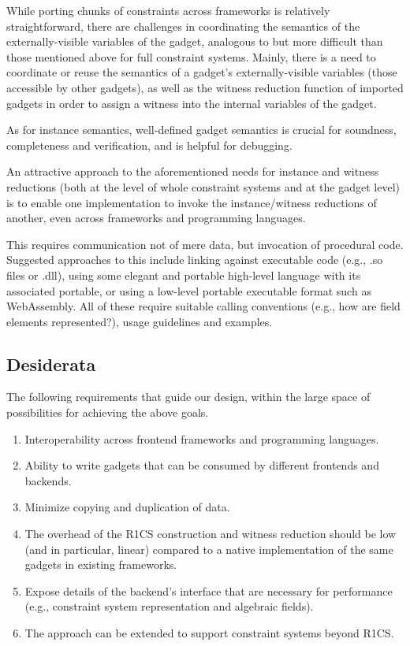 \documentclass[a4paper,12pt]{article}
\begin{document}
While porting chunks of constraints across frameworks is relatively straightforward, there are challenges in coordinating the semantics of the externally-visible variables of the gadget, analogous to but more difficult than those mentioned above for full constraint systems. Mainly, there is a need to coordinate or reuse the semantics of a gadget’s externally-visible variables (those accessible by other gadgets), as well as the witness reduction function of imported gadgets in order to assign a witness into the internal variables of the gadget.

As for instance semantics, well-defined gadget semantics is crucial for soundness, completeness and verification, and is helpful for debugging.

An attractive approach to the aforementioned needs for instance and witness reductions (both at the level of whole constraint systems and at the gadget level) is to enable one implementation to invoke the instance/witness reductions of another, even across frameworks and programming languages.

This requires communication not of mere data, but invocation of procedural code. Suggested approaches to this include linking against executable code (e.g., .so files or .dll), using some elegant and portable high-level language with its associated portable, or using a low-level portable executable format such as WebAssembly. All of these require suitable calling conventions (e.g., how are field elements represented?), usage guidelines and examples.


\subsection{Desiderata}
The following requirements that guide our design, within the large space of possibilities for achieving the above goals.

\begin{enumerate}
	\item Interoperability across frontend frameworks and programming languages.
	\item Ability to write gadgets that can be consumed by different frontends and backends.
	\item Minimize copying and duplication of data.
	\item The overhead of the R1CS construction and witness reduction should be low (and in particular, linear) compared to a native implementation of the same gadgets in existing frameworks.
	\item Expose details of the backend's interface that are necessary for performance (e.g., constraint system representation and algebraic fields).
	\item The approach can be extended to support constraint systems beyond R1CS.
\end{enumerate}
\end{document}
